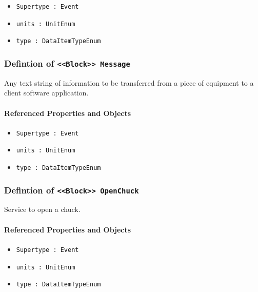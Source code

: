 \begin{itemize}
\item \texttt{Supertype : Event}

\item \texttt{units : UnitEnum}

\item \texttt{type : DataItemTypeEnum}

\end{itemize}
\FloatBarrier
\subsubsection{Defintion of \texttt{<<Block>> Message}}
  \label{type:Message}

\FloatBarrier

Any text string of information to be transferred from a piece of equipment to a client software application.

\FloatBarrier
\paragraph{Referenced Properties and Objects}

\begin{itemize}
\item \texttt{Supertype : Event}

\item \texttt{units : UnitEnum}

\item \texttt{type : DataItemTypeEnum}

\end{itemize}
\FloatBarrier
\subsubsection{Defintion of \texttt{<<Block>> OpenChuck}}
  \label{type:OpenChuck}

\FloatBarrier

Service to open a chuck.

\FloatBarrier
\paragraph{Referenced Properties and Objects}

\begin{itemize}
\item \texttt{Supertype : Event}

\item \texttt{units : UnitEnum}

\item \texttt{type : DataItemTypeEnum}

\end{itemize}
\FloatBarrier
